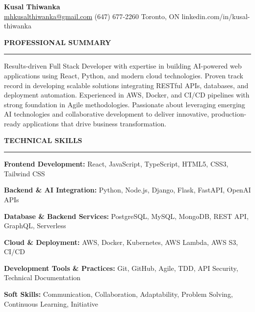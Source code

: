 \documentclass[10pt,letterpaper]{article}
\begin{document}
\begin{center}
{\LARGE\textbf{Kusal Thiwanka}}\\[3pt]
\href{mailto:mhkusalthiwanka@gmail.com}{mhkusalthiwanka@gmail.com}\hspace{2em}%
(647) 677{-}2260\hspace{2em}%
Toronto, ON\hspace{2em}
linkedin.com/in/kusal-thiwanka
\end{center}

\vspace{6pt}

\textbf{PROFESSIONAL SUMMARY}\\[-8pt]
\noindent\rule{\textwidth}{1pt}

\vspace{-2pt}

Results-driven Full Stack Developer with expertise in building AI-powered web applications using React, Python, and modern cloud technologies. Proven track record in developing scalable solutions integrating RESTful APIs, databases, and deployment automation. Experienced in AWS, Docker, and CI/CD pipelines with strong foundation in Agile methodologies. Passionate about leveraging emerging AI technologies and collaborative development to deliver innovative, production-ready applications that drive business transformation.

\vspace{8pt}

\textbf{TECHNICAL SKILLS}\\[-8pt]
\noindent\rule{\textwidth}{1pt}

\vspace{-2pt}

\textbf{Frontend Development:} React, JavaScript, TypeScript, HTML5, CSS3, Tailwind CSS

\textbf{Backend \& AI Integration:} Python, Node.js, Django, Flask, FastAPI, OpenAI APIs

\textbf{Database \& Backend Services:} PostgreSQL, MySQL, MongoDB, REST API, GraphQL, Serverless

\textbf{Cloud \& Deployment:} AWS, Docker, Kubernetes, AWS Lambda, AWS S3, CI/CD

\textbf{Development Tools \& Practices:} Git, GitHub, Agile, TDD, API Security, Technical Documentation

\textbf{Soft Skills:} Communication, Collaboration, Adaptability, Problem Solving, Continuous Learning, Initiative

\vspace{8pt}
\end{document}
